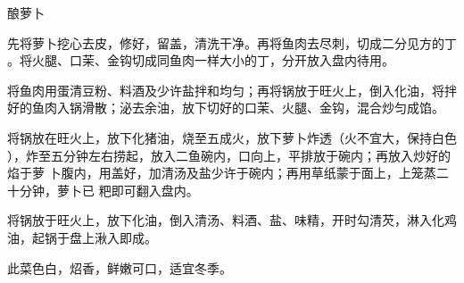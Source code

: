 \begin{recipe}{酿萝卜}

\ingredients


\preparation

\step 先将萝卜挖心去皮，修好，留盖，清洗干净。再将鱼肉去尽刺，切成二分见方的丁
。将火腿、口茉、金钩切成同鱼肉一样大小的丁，分开放入盘内待用。

\step 将鱼肉用蛋清豆粉、料酒及少许盐拌和均匀；再将锅放于旺火上，倒入化油，将拌
好的鱼肉入锅滑散；泌去余油，放下切好的口茉、火腿、金钩，混合炒匀成馅。

\step 将锅放在旺火上，放下化猪油，烧至五成火，放下萝卜炸透（火不宜大，保持白色
），炸至五分钟左右捞起，放入二鱼碗内，口向上，平排放于碗内；再放入炒好的焰于萝
卜腹内，用盖好，加清汤及盐少许于碗内；再用草纸蒙于面上，上笼蒸二十分钟，萝卜已
粑即可翻入盘内。

\step 将锅放于旺火上，放下化油，倒入清汤、料酒、盐、味精，开时勾清芡，淋入化鸡
油，起锅于盘上湫入即成。

\features

此菜色白，炤香，鲜嫩可口，适宜冬季。

\end{recipe}

